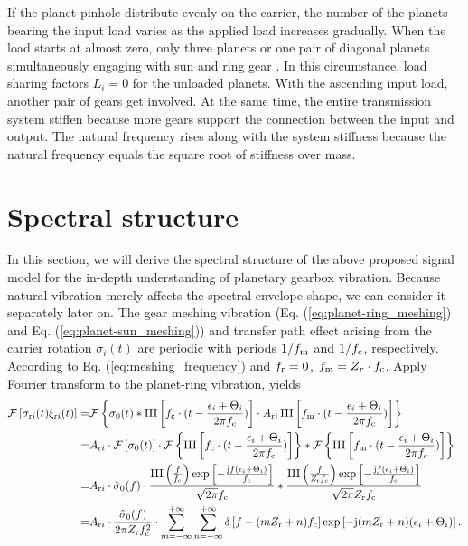 \documentclass[a4paper,fleqn]{cas-sc}%
\begin{document}
\par If the planet pinhole distribute evenly on the carrier, the number of the planets bearing the input load varies as the applied load increases gradually. When the load starts at almost zero, only three planets or one pair of diagonal planets simultaneously engaging with sun and ring gear \cite{Ligata2009}. In this circumstance, load sharing factors $L_i=0$ for the unloaded planets. With the ascending input load, another pair of gears get involved. At the same time, the entire transmission system stiffen because more gears support the connection between the input and output. The natural frequency rises along with the system stiffness because the natural frequency equals the square root of stiffness over mass.
\section{Spectral structure \label{sec:spectral_structure}}
\par In this section, we will derive the spectral structure of the above proposed signal model for the in-depth understanding of planetary gearbox vibration. Because natural vibration merely affects the spectral envelope shape, we can consider it separately later on. The gear meshing vibration (Eq. (\ref{eq:planet-ring_meshing}) and Eq. (\ref{eq:planet-sun_meshing})) and transfer path effect arising from the carrier rotation $\sigma_{i}(t)$ are periodic with periods $1/f_{\rm m}$ and $1/f_{\rm c}$, respectively. According to Eq. (\ref{eq:meshing_frequency}) and $f_{\rm r}=0$, $f_{\rm m}=Z_{r} \cdot f_{\rm c}$. Apply Fourier transform to the planet-ring vibration, yields
\begin{equation}
\begin{split}
    \mathcal{F}\left[ \sigma_{{\rm r}i}(t) \xi_{{\rm r}i}(t) \right]=&\mathcal{F}\left\{\sigma_0(t) \ast \operatorname{III}\left[f_{\rm c} \cdot (t - \frac{\epsilon_i+\Theta_i}{2 \pi f_{\rm c}})\right] \cdot A_{{\rm r}i}\operatorname{III}\left[f_{\rm m} \cdot (t-\frac{\epsilon_i+\Theta_i}{2 \pi f_{\rm c}})\right]\right\}\\
    =&A_{{\rm r}i} \cdot \mathcal{F}\left[\sigma_0(t)\right] \cdot \mathcal{F}\left\{\operatorname{III}\left[f_{\rm c} \cdot (t - \frac{\epsilon_i+\Theta_i}{2 \pi f_{\rm c}})\right] \right\}
    \ast \mathcal{F}\left\{ \operatorname{III}\left[f_{\rm m} \cdot (t-\frac{\epsilon_i+\Theta_i}{2 \pi f_{\rm c}})\right] \right\}\\
=&A_{{\rm r}i} \cdot \hat{\sigma}_0(f) \cdot \frac{\operatorname{III}\left(\frac{f}{f_{\rm c}}\right) \exp\left[-\frac{{\rm j} f (\epsilon_i+\Theta_i)}{f_{\rm c}}\right]}{\sqrt{2 \pi} f_{\rm c}} \ast \frac{\operatorname{III}\left(\frac{f}{ Z_{\rm r} f_{\rm c}}\right) \exp\left[-\frac{{\rm j} f (\epsilon_i+\Theta_i)}{ f_{\rm c}}\right]}{\sqrt{2 \pi } Z_{\rm r}f_{\rm c}}\\
=&A_{{\rm r}i} \cdot \frac{\hat{\sigma}_0(f)}{2 \pi Z_{\rm r} f_{\rm c}^{2}} \cdot \sum_{m=-\infty}^{+\infty} \sum_{n=-\infty}^{+\infty} \delta\left[f-(mZ_{\rm r}+n)f_{\rm c}\right] \exp\left[-{\rm j}(m Z_{\rm r}+n)(\epsilon_i+\Theta_i)\right].
\end{split}
\end{equation}
\end{document}
